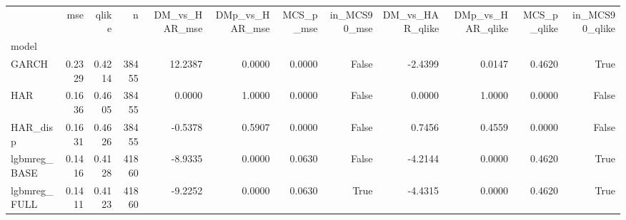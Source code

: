 \begin{tabular}{lrrrrrrrrrrr}
\toprule
 & mse & qlike & n & DM_vs_HAR_mse & DMp_vs_HAR_mse & MCS_p_mse & in_MCS90_mse & DM_vs_HAR_qlike & DMp_vs_HAR_qlike & MCS_p_qlike & in_MCS90_qlike \\
model &  &  &  &  &  &  &  &  &  &  &  \\
\midrule
GARCH & 0.2329 & 0.4214 & 38455 & 12.2387 & 0.0000 & 0.0000 & False & -2.4399 & 0.0147 & 0.4620 & True \\
HAR & 0.1636 & 0.4605 & 38455 & 0.0000 & 1.0000 & 0.0000 & False & 0.0000 & 1.0000 & 0.0000 & False \\
HAR_disp & 0.1631 & 0.4626 & 38455 & -0.5378 & 0.5907 & 0.0000 & False & 0.7456 & 0.4559 & 0.0000 & False \\
lgbmreg_BASE & 0.1416 & 0.4128 & 41860 & -8.9335 & 0.0000 & 0.0630 & False & -4.2144 & 0.0000 & 0.4620 & True \\
lgbmreg_FULL & 0.1411 & 0.4123 & 41860 & -9.2252 & 0.0000 & 0.0630 & True & -4.4315 & 0.0000 & 0.4620 & True \\
\bottomrule
\end{tabular}
